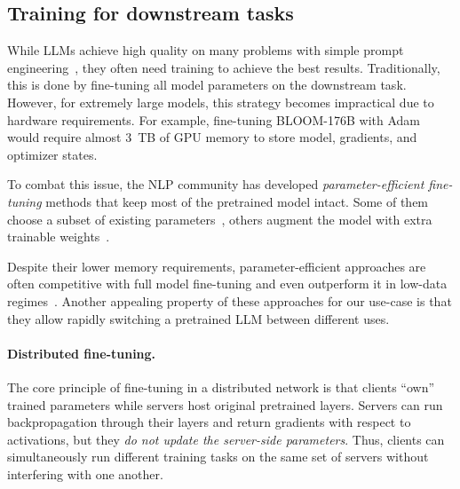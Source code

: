 
\subsection{Training for downstream tasks}\label{sect:design_training}

While LLMs achieve high quality on many problems with simple prompt engineering~\cite{gpt3}, they often need training to achieve the best results. Traditionally, this is done by fine-tuning all model parameters on the downstream task.
However, for extremely large models, this strategy becomes impractical due to hardware requirements. For example, fine-tuning BLOOM-176B with Adam would require almost 3~TB of GPU memory to store model, gradients, and optimizer states.

To combat this issue, the NLP community has developed \textit{parameter-efficient fine-tuning} methods that keep most of the pretrained model intact. Some of them choose a subset of existing parameters~\cite{sung2021training,guo2021parameter}, others augment the model with extra trainable weights~\cite{hu2021lora, houlsby2019parameter, ptune-liu, ptune-lester, ptune-v2, tfew}.

Despite their lower memory requirements, parameter-efficient approaches are often competitive with full model fine-tuning \cite{hu2021lora,ptune-v2,yong_adapting} and even outperform it in low-data regimes~\cite{2205.05638}. Another appealing property of these approaches for our use-case is that they allow rapidly switching a pretrained LLM between different uses.


\paragraph{Distributed fine-tuning.} The core principle of fine-tuning in a distributed network is that clients ``own'' trained parameters while servers host original pretrained layers. Servers can run backpropagation through their layers and return gradients with respect to activations, but they \textit{do not update the server-side parameters}. Thus, clients can simultaneously run different training tasks on the same set of servers without interfering with one another.

